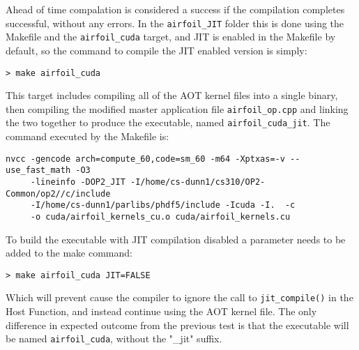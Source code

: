 Ahead of time compalation is considered a success if the compilation completes successful, without any errors. In the \verb|airfoil_JIT| folder this is done using the Makefile and the \verb|airfoil_cuda| target, and JIT is enabled in the Makefile by default, so the command to compile the JIT enabled version is simply:
\begin{verbatim}
> make airfoil_cuda
\end{verbatim}
This target includes compiling all of the AOT kernel files into a single binary, then compiling the modified master application file \verb|airfoil_op.cpp| and linking the two together to produce the executable, named \verb|airfoil_cuda_jit|.
The command executed by the Makefile is:
\begin{verbatim}
nvcc -gencode arch=compute_60,code=sm_60 -m64 -Xptxas=-v --use_fast_math -O3
     -lineinfo -DOP2_JIT -I/home/cs-dunn1/cs310/OP2-Common/op2//c/include
     -I/home/cs-dunn1/parlibs/phdf5/include -Icuda -I.	-c
     -o cuda/airfoil_kernels_cu.o cuda/airfoil_kernels.cu
\end{verbatim}

To build the executable with JIT compilation disabled a parameter needs to be added to the make command:
\begin{verbatim}
> make airfoil_cuda JIT=FALSE
\end{verbatim}
Which will prevent cause the compiler to ignore the call to \verb|jit_compile()| in the Host Function, and instead continue using the AOT kernel file. The only difference in expected outcome from the previous test is that the executable will be named \verb|airfoil_cuda|, without the "\_jit" suffix.


